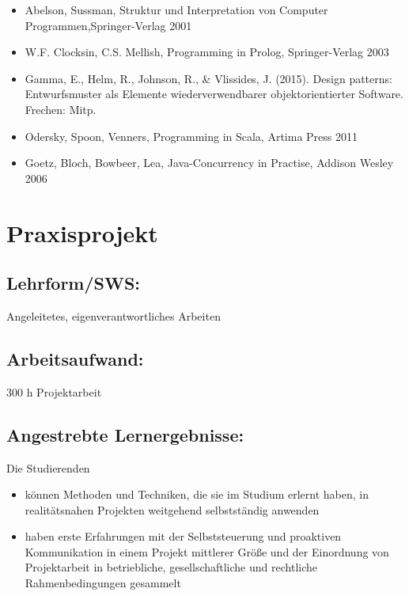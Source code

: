 \begin{itemize}
\item
  Abelson, Sussman, Struktur und Interpretation von Computer
  Programmen,Springer-Verlag 2001
\item
  W.F. Clocksin, C.S. Mellish, Programming in Prolog, Springer-Verlag
  2003
\item
  Gamma, E., Helm, R., Johnson, R., \& Vlissides, J. (2015). Design
  patterns: Entwurfsmuster als Elemente wiederverwendbarer
  objektorientierter Software. Frechen: Mitp.
\item
  Odersky, Spoon, Venners, Programming in Scala, Artima Press 2011
\item
  Goetz, Bloch, Bowbeer, Lea, Java-Concurrency in Practise, Addison
  Wesley 2006
\end{itemize}

\chapter{Praxisprojekt}\label{praxisprojekt}

\section*{Lehrform/SWS:}\label{lehrformsws-14}

Angeleitetes, eigenverantwortliches Arbeiten

\section*{Arbeitsaufwand:}\label{arbeitsaufwand-11}

300 h Projektarbeit

\section*{Angestrebte
Lernergebnisse:}\label{angestrebte-lernergebnisse-18}

Die Studierenden

\begin{itemize}
\item
  können Methoden und Techniken, die sie im Studium erlernt haben, in
  realitätsnahen Projekten weitgehend selbstständig anwenden
\item
  haben erste Erfahrungen mit der Selbststeuerung und proaktiven
  Kommunikation in einem Projekt mittlerer Größe und der Einordnung von
  Projektarbeit in betriebliche, gesellschaftliche und rechtliche
  Rahmenbedingungen gesammelt
\end{itemize}

